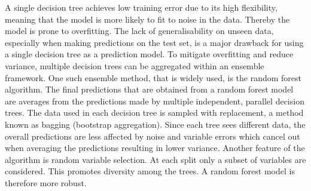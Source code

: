 \documentclass[11pt]{article}
\begin{document}
A single decision tree achieves low training error due to its high flexibility, meaning that the model is more likely to fit to noise in the data. Thereby the model is prone to overfitting. The lack of generalisability on unseen data, especially when making predictions on the test set, is a major drawback for using a single decision tree as a prediction model. To mitigate overfitting and reduce variance, multiple decision trees can be aggregated within an ensemble framework. One such ensemble method, that is widely used, is the random forest algorithm\cite{Biau2015}. The final predictions that are obtained from a random forest model are averages from the predictions made by multiple independent, parallel decision trees\cite{Breiman2001}. The data used in each decision tree is sampled with replacement, a method known as bagging (bootstrap aggregation). Since each tree sees different data, the overall predictions are less affected by noise and variable errors which cancel out when averaging the predictions resulting in lower variance. Another feature of the algorithm is random variable selection. At each split only a subset of variables are considered. This promotes diversity among the trees. A random forest model is therefore more robust. 



\end{document}

